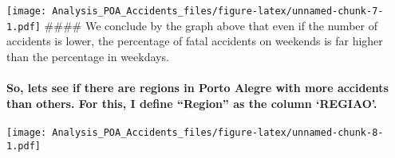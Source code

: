 \documentclass[]{article}
\newenvironment{Shaded}{\begin{snugshade}}{\end{snugshade}}
\newcommand{\KeywordTok}[1]{\textcolor[rgb]{0.13,0.29,0.53}{\textbf{#1}}}
\newcommand{\DataTypeTok}[1]{\textcolor[rgb]{0.13,0.29,0.53}{#1}}
\newcommand{\StringTok}[1]{\textcolor[rgb]{0.31,0.60,0.02}{#1}}
\newcommand{\OperatorTok}[1]{\textcolor[rgb]{0.81,0.36,0.00}{\textbf{#1}}}
\newcommand{\NormalTok}[1]{#1}
\let\oldparagraph\paragraph
\renewcommand{\paragraph}[1]{\oldparagraph{#1}\mbox{}}
\begin{document}
\texttt{[image: Analysis\_POA\_Accidents\_files/figure-latex/unnamed-chunk-7-1.pdf]}
\#\#\#\# We conclude by the graph above that even if the number of
accidents is lower, the percentage of fatal accidents on weekends is far
higher than the percentage in weekdays.

\paragraph{\texorpdfstring{So, lets see if there are regions in Porto
Alegre with more accidents than others. For this, I define ``Region'' as
the column
`REGIAO'.}{So, lets see if there are regions in Porto Alegre with more accidents than others. For this, I define Region as the column REGIAO.}}\label{so-lets-see-if-there-are-regions-in-porto-alegre-with-more-accidents-than-others.-for-this-i-define-region-as-the-column-regiao.}

\begin{Shaded}
\end{Shaded}

\texttt{[image: Analysis\_POA\_Accidents\_files/figure-latex/unnamed-chunk-8-1.pdf]}
\end{document}
